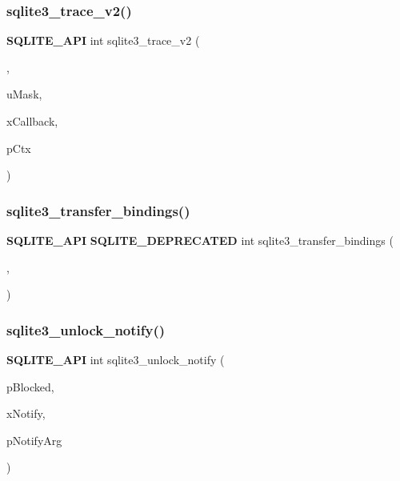 \subsubsection{sqlite3\_trace\_v2()}
{\footnotesize\ttfamily \textbf{ S\+Q\+L\+I\+T\+E\+\_\+\+A\+PI} int sqlite3\+\_\+trace\+\_\+v2 (\begin{DoxyParamCaption}\item[{\textbf{ sqlite3} $\ast$}]{,  }\item[{unsigned}]{u\+Mask,  }\item[{int($\ast$)(unsigned, void $\ast$, void $\ast$, void $\ast$)}]{x\+Callback,  }\item[{void $\ast$}]{p\+Ctx }\end{DoxyParamCaption})}

\mbox{\label{sqlite3_8h_a62b0ff01b83a4d0cba99eef26cb99315}} 
\subsubsection{sqlite3\_transfer\_bindings()}
{\footnotesize\ttfamily \textbf{ S\+Q\+L\+I\+T\+E\+\_\+\+A\+PI} \textbf{ S\+Q\+L\+I\+T\+E\+\_\+\+D\+E\+P\+R\+E\+C\+A\+T\+ED} int sqlite3\+\_\+transfer\+\_\+bindings (\begin{DoxyParamCaption}\item[{\textbf{ sqlite3\+\_\+stmt} $\ast$}]{,  }\item[{\textbf{ sqlite3\+\_\+stmt} $\ast$}]{ }\end{DoxyParamCaption})}

\mbox{\label{sqlite3_8h_a0b5961adc4b190e73a14fbc4219affb6}} 
\subsubsection{sqlite3\_unlock\_notify()}
{\footnotesize\ttfamily \textbf{ S\+Q\+L\+I\+T\+E\+\_\+\+A\+PI} int sqlite3\+\_\+unlock\+\_\+notify (\begin{DoxyParamCaption}\item[{\textbf{ sqlite3} $\ast$}]{p\+Blocked,  }\item[{void($\ast$)(void $\ast$$\ast$ap\+Arg, int n\+Arg)}]{x\+Notify,  }\item[{void $\ast$}]{p\+Notify\+Arg }\end{DoxyParamCaption})}

